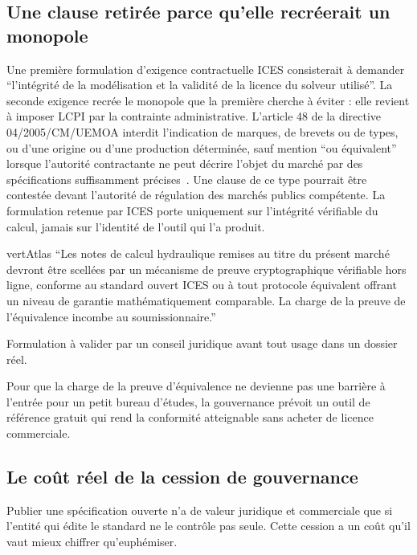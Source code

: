 \documentclass[11pt,a4paper]{article}
\begin{document}
\subsection{Une clause retirée parce qu'elle recréerait un monopole}

Une première formulation d'exigence contractuelle ICES consisterait à demander \enquote{l'intégrité de la modélisation et la validité de la licence du solveur utilisé}. La seconde exigence recrée le monopole que la première cherche à éviter : elle revient à imposer LCPI par la contrainte administrative. L'article 48 de la directive 04/2005/CM/UEMOA interdit l'indication de marques, de brevets ou de types, ou d'une origine ou d'une production déterminée, sauf mention \enquote{ou équivalent} lorsque l'autorité contractante ne peut décrire l'objet du marché par des spécifications suffisamment précises~\cite{uemoa2005}. Une clause de ce type pourrait être contestée devant l'autorité de régulation des marchés publics compétente. La formulation retenue par ICES porte uniquement sur l'intégrité vérifiable du calcul, jamais sur l'identité de l'outil qui l'a produit.

\begin{icesbox}{vertAtlas}
\enquote{Les notes de calcul hydraulique remises au titre du présent marché devront être scellées par un mécanisme de preuve cryptographique vérifiable hors ligne, conforme au standard ouvert ICES ou à tout protocole équivalent offrant un niveau de garantie mathématiquement comparable. La charge de la preuve de l'équivalence incombe au soumissionnaire.}

\small Formulation à valider par un conseil juridique avant tout usage dans un dossier réel.
\end{icesbox}

Pour que la charge de la preuve d'équivalence ne devienne pas une barrière à l'entrée pour un petit bureau d'études, la gouvernance prévoit un outil de référence gratuit qui rend la conformité atteignable sans acheter de licence commerciale.

\subsection{Le coût réel de la cession de gouvernance}

Publier une spécification ouverte n'a de valeur juridique et commerciale que si l'entité qui édite le standard ne le contrôle pas seule. Cette cession a un coût qu'il vaut mieux chiffrer qu'euphémiser.
\end{document}
